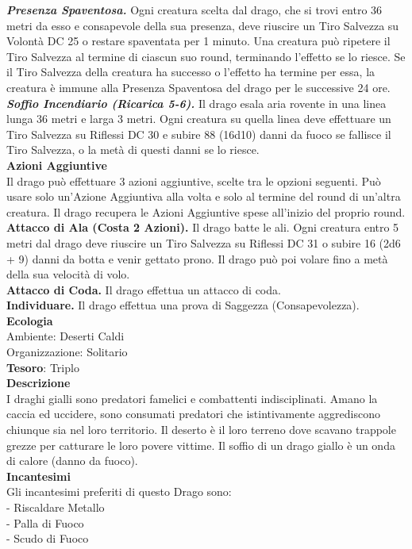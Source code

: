 \begin{multicols}{2}
	\textit{\textbf{Presenza Spaventosa.}} Ogni creatura scelta dal drago, che si trovi entro 36 metri da esso e consapevole della sua presenza, deve riuscire un Tiro Salvezza su Volontà DC 25 o restare spaventata per 1 minuto. Una creatura può ripetere il Tiro Salvezza al termine di ciascun suo round, terminando l'effetto se lo riesce. Se il Tiro Salvezza della creatura ha successo o l'effetto ha termine per essa, la creatura è immune alla Presenza Spaventosa del drago per le successive 24 ore.\\
	\textit{\textbf{Soffio Incendiario (Ricarica 5-6).}} Il drago esala aria rovente in una linea lunga 36 metri e larga 3 metri. Ogni creatura su quella linea deve effettuare un Tiro Salvezza su Riflessi DC 30 e subire 88 (16d10) danni da fuoco se fallisce il Tiro Salvezza, o la metà di questi danni se lo riesce.\\
	\textbf{Azioni Aggiuntive}\\
	Il drago può effettuare 3 azioni aggiuntive, scelte tra le opzioni seguenti. Può usare solo un'Azione Aggiuntiva alla volta e solo al termine del round di un'altra creatura. Il drago recupera le Azioni Aggiuntive spese all'inizio del proprio round.\\
	\textbf{Attacco di Ala (Costa 2 Azioni).} Il drago batte le ali. Ogni creatura entro 5 metri dal drago deve riuscire un Tiro Salvezza su Riflessi DC 31 o subire 16 (2d6 + 9) danni da botta e venir gettato prono. Il drago può poi volare fino a metà della sua velocità di volo.\\
	\textbf{Attacco di Coda.} Il drago effettua un attacco di coda.\\
	\textbf{Individuare.} Il drago effettua una prova di Saggezza (Consapevolezza).\\
	\textbf{Ecologia}\\
	Ambiente: Deserti Caldi\\
	Organizzazione: Solitario\\
	\textbf{Tesoro}: Triplo\\
	\textbf{Descrizione}\\
	I draghi gialli sono predatori famelici e combattenti indisciplinati. Amano la caccia ed uccidere, sono consumati predatori che istintivamente aggrediscono chiunque sia nel loro territorio. Il deserto è il loro terreno dove scavano trappole grezze per catturare le loro povere vittime.
	Il soffio di un drago giallo è un onda di calore (danno da fuoco).
	\\
	\textbf{Incantesimi}\\
	Gli incantesimi preferiti di questo Drago sono:\\
	- Riscaldare Metallo\\
	- Palla di Fuoco\\
	- Scudo di Fuoco



\end{multicols}
